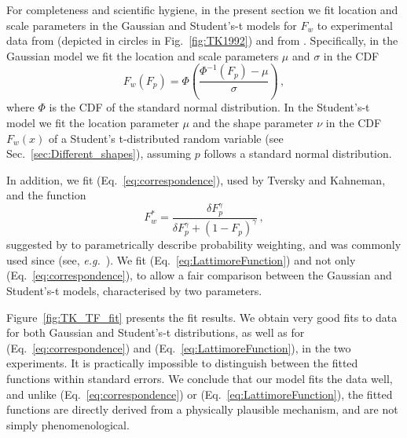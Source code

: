 \documentclass[a4paper, 12pt]{article}
\newcommand{\elabel}[1]{\label{eq:#1}}
\newcommand{\eref}[1]{(Eq.~\ref{eq:#1})}
\newcommand{\fref}[1]{Fig.~\ref{fig:#1}}
\newcommand{\Fref}[1]{Figure~\ref{fig:#1}}
\newcommand{\secref}[1]{Sec.~\ref{sec:#1}}
\newcommand{\eg}{{\it e.g.}\ }
\newcommand{\be}{\begin{equation}}
\newcommand{\ee}{\end{equation}}
\begin{document}
For completeness and scientific hygiene, in the present section we fit location and scale parameters in the Gaussian and Student's-t models for $F_w$ to experimental data from \cite{TverskyKahneman1992} (depicted in circles in \fref{TK1992}) and from \cite{TverskyFox1995}. Specifically, in the Gaussian model we fit the location and scale parameters $\mu$ and $\sigma$ in the CDF
%
\be
F_w\left(F_p\right) = \Phi\left(\frac{\Phi^{-1}\left(F_p\right) - \mu}{\sigma}\right)\,,
\ee
%
where $\Phi$ is the CDF of the standard normal distribution. In the Student's-t model we fit the location parameter $\mu$ and the shape parameter $\nu$ in the CDF $F_w\left(x\right)$ of a Student's t-distributed random variable (see \secref{Different_shapes}), assuming $p$ follows a standard normal distribution.


In addition, we fit \eref{correspondence}, used by Tversky and Kahneman, and the function
%
\be
F^*_w =\frac{\delta F_p^{\gamma}}{\delta F_p^{\gamma} + \left(1-F_p\right)^{\gamma}}\,,
\elabel{LattimoreFunction}
\ee
%
suggested by \cite{LattimoreBakerWitte1992} to parametrically describe probability weighting, and was commonly used since (see, \eg \cite{tversky1995risk}). We fit \eref{LattimoreFunction} and not only \eref{correspondence}, to allow a fair comparison between the Gaussian and Student's-t models, characterised by two parameters.

\Fref{TK_TF_fit} presents the fit results. We obtain very good fits to data for both Gaussian and Student's-t distributions, as well as for \eref{correspondence} and \eref{LattimoreFunction}, in the two experiments. It is practically impossible to distinguish between the fitted functions within standard errors. We conclude that our model fits the data well, and unlike \eref{correspondence} or \eref{LattimoreFunction}, the fitted functions are directly derived from a physically plausible mechanism, and are not simply phenomenological.
\end{document}
